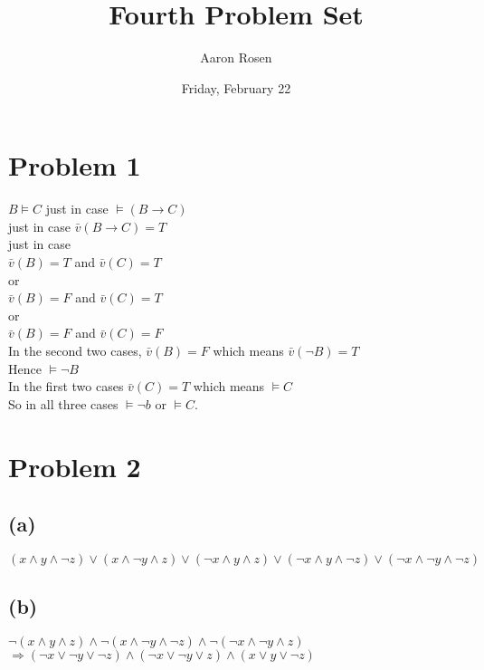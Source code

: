 \documentclass[11pt, a4paper, oneside]{article}
\begin{document}
\title{Fourth Problem Set}
\author{Aaron Rosen}
\date{Friday, February 22}
\maketitle

\section*{Problem 1}
$B \models C$ just in case $\models (B \to C)$ \\
just in case $\bar{v}(B \to C) = T$ \\
just in case \\
$\bar{v}(B) = T$ and $\bar{v}(C) = T$ \\
or \\
$\bar{v}(B) = F$ and $\bar{v}(C) = T$ \\
or \\
$\bar{v}(B) = F$ and $\bar{v}(C) = F$ \\
In the second two cases, $\bar{v}(B) = F$ 
   which means $\bar{v}(\neg{B}) = T$\\ 
Hence $\models \neg{B}$\\
In the first two cases $\bar{v}(C) = T$ which means $\models C$\\
So in all three cases $\models \neg{b}$ or $\models C$.


\section*{Problem 2}
\subsection*{(a)}
$(x \land y \land \neg{z}) \lor (x \land \neg{y} \land z) 
   \lor (\neg{x} \land y \land z) \lor (\neg{x} \land y \land \neg{z})
   \lor (\neg{x} \land \neg{y} \land \neg{z})$

\subsection*{(b)}
$\neg{(x \land y \land z)} \land \neg{(x \land \neg{y} \land \neg{z})}
      \land \neg{(\neg{x} \land \neg{y} \land z)}$\\
$\Rightarrow (\neg{x} \lor \neg{y} \lor \neg{z}) 
      \land (\neg{x} \lor \neg{y} \lor z) \land (x \lor y \lor \neg{z})$
\end{document}
